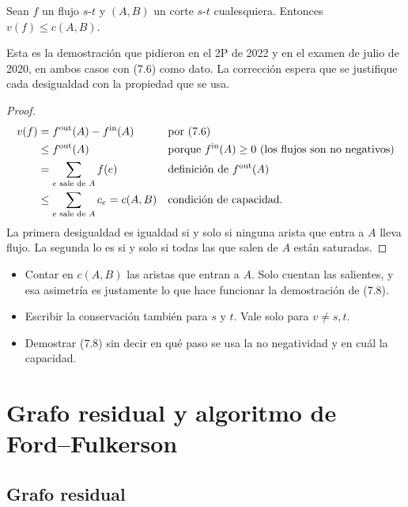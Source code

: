 \begin{resultado}[(7.8)]
Sean $f$ un flujo $s$-$t$ y $(A,B)$ un corte $s$-$t$ cualesquiera. Entonces $v(f)\le c(A,B)$.
\end{resultado}

Esta es la demostración que pidieron en el 2P de 2022 y en el examen de julio de 2020, en ambos casos con (7.6) como dato. La corrección espera que se justifique cada desigualdad con la propiedad que se usa.

\begin{proof}
\begin{align*}
v(f) &= f^{\mathrm{out}}(A)-f^{\mathrm{in}}(A) && \text{por (7.6)}\\
     &\le f^{\mathrm{out}}(A) && \text{porque } f^{\mathrm{in}}(A)\ge 0 \text{ (los flujos son no negativos)}\\
     &= \sum_{e\text{ sale de }A} f(e) && \text{definición de } f^{\mathrm{out}}(A)\\
     &\le \sum_{e\text{ sale de }A} c_e = c(A,B) && \text{condición de capacidad.}
\end{align*}
La primera desigualdad es igualdad si y solo si ninguna arista que entra a $A$ lleva flujo. La segunda lo es si y solo si todas las que salen de $A$ están saturadas.
\end{proof}

\begin{trampa}
\begin{itemize}
  \item Contar en $c(A,B)$ las aristas que entran a $A$. Solo cuentan las salientes, y esa asimetría es justamente lo que hace funcionar la demostración de (7.8).
  \item Escribir la conservación también para $s$ y $t$. Vale solo para $v\ne s,t$.
  \item Demostrar (7.8) sin decir en qué paso se usa la no negatividad y en cuál la capacidad.
\end{itemize}
\end{trampa}

\section{Grafo residual y algoritmo de Ford–Fulkerson}

\subsection{Grafo residual}

